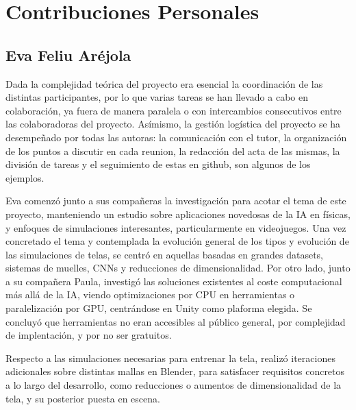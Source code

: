 \chapter*{Contribuciones Personales}
\label{cap:contribucionesPersonales}

\section*{Eva Feliu Aréjola}
Dada la complejidad teórica del proyecto era esencial la coordinación de las distintas participantes, por lo que varias tareas se han llevado a cabo en colaboración, ya fuera de manera paralela o con intercambios consecutivos entre las colaboradoras del proyecto. Asímismo, la gestión logística del proyecto se ha desempeñado por todas las autoras: la comunicación con el tutor, la organización de los puntos a discutir en cada reunion, la redacción del acta de las mismas, la división de tareas y el seguimiento de estas en github, son algunos de los ejemplos. \newline

Eva comenzó junto a sus compañeras la investigación para acotar el tema de este proyecto, manteniendo un estudio sobre aplicaciones novedosas de la IA en físicas, y enfoques de simulaciones interesantes, particularmente en videojuegos. Una vez concretado el tema y contemplada la evolución general de los tipos y evolución de las simulaciones de telas, se centró en aquellas basadas en grandes datasets, sistemas de muelles, CNNs y reducciones de dimensionalidad. Por otro lado, junto a su compañera Paula, investigó las soluciones existentes al coste computacional más allá de la IA, viendo optimizaciones por CPU en herramientas o paralelización por GPU, centrándose en Unity como plaforma elegida. Se concluyó que herramientas no eran accesibles al público general, por complejidad de implentación, y por no ser gratuitos. \newline

Respecto a las simulaciones necesarias para entrenar la tela, realizó iteraciones adicionales sobre distintas mallas en Blender, para satisfacer requisitos concretos a lo largo del desarrollo, como reducciones o aumentos de dimensionalidad de la tela, y su posterior puesta en escena. \newline

